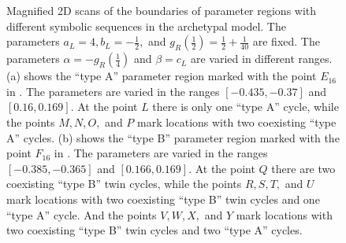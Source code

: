 \begin{figure}
	\centering
	\caption[Magnified 2D scans of the boundaries of parameter regions with different symbolic sequences in the archetypal model]{
		Magnified 2D scans of the boundaries of parameter regions with different symbolic sequences in the archetypal model.
		The parameters $a_L = 4, b_L = -\frac{1}{2},$ and $g_R\left(\frac{1}{2}\right) = \frac{1}{2} + \frac{1}{40}$ are fixed.
		The parameters $\alpha = -g_R\left(\frac{1}{4}\right)$ and $\beta = c_L$ are varied in different ranges.
		(a) shows the ``type A'' parameter region marked with the point $E_{16}$ in .
		The parameters are varied in the ranges $[-0.435, -0.37]$ and $[0.16, 0.169]$.
		At the point $L$ there is only one ``type A'' cycle, while the points $M, N, O,$ and $P$ mark locations with two coexisting ``type A'' cycles.
		(b) shows the ``type B'' parameter region marked with the point $F_{16}$ in .
		The parameters are varied in the ranges $[-0.385, -0.365]$ and $[0.166, 0.169]$.
		At the point $Q$ there are two coexisting ``type B'' twin cycles, while the points $R, S, T,$ and $U$ mark locations with two coexisting ``type B'' twin cycles and one ``type A'' cycle.
		And the points $V, W, X,$ and $Y$ mark locations with two coexisting ``type B'' twin cycles and two ``type A'' cycles.
	}
	\label{fig:arch.coex.regions}
\end{figure}


